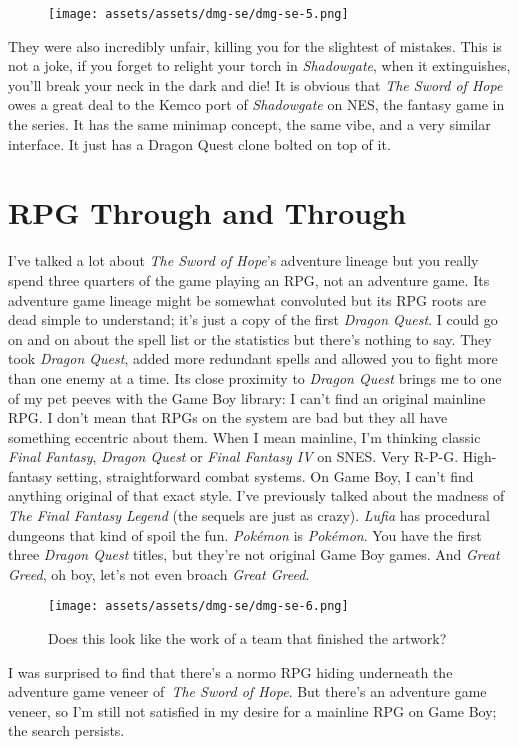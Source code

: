 \documentclass{book}
\begin{document}
\begin{figure}[hbt]
\vskip 10pt
\centering \texttt{[image: assets/assets/dmg-se/dmg-se-5.png]}
\vskip 6pt
\end{figure}
They were also incredibly unfair, killing you for the slightest of mistakes. This is not a joke, if you forget to relight your torch in \emph{Shadowgate}, when it extinguishes, you’ll break your neck in the dark and die! It is obvious that \emph{The Sword of Hope} owes a great deal to the Kemco port of \emph{Shadowgate} on NES, the fantasy game in the series. It has the same minimap concept, the same vibe, and a very similar interface. It just has a Dragon Quest clone bolted on top of it.

\FloatBarrier\needspace{10mm}\section*{RPG Through and Through}\nopagebreak[4]

I’ve talked a lot about \emph{The Sword of Hope}’s adventure lineage but you really spend three quarters of the game playing an RPG, not an adventure game. Its adventure game lineage might be somewhat convoluted but its RPG roots are dead simple to understand; it’s just a copy of the first \emph{Dragon Quest}. I could go on and on about the spell list or the statistics but there’s nothing to say. They took \emph{Dragon Quest}, added more redundant spells and allowed you to fight more than one enemy at a time. Its close proximity to \emph{Dragon Quest} brings me to one of my pet peeves with the Game Boy library: I can’t find an original mainline RPG. I don’t mean that RPGs on the system are bad but they all have something eccentric about them. When I mean mainline, I’m thinking classic \emph{Final Fantasy}, \emph{Dragon Quest} or \emph{Final Fantasy IV} on SNES. Very R-P-G. High-fantasy setting, straightforward combat systems. On Game Boy, I can’t find anything original of that exact style. I’ve previously talked about the madness of \emph{The Final Fantasy Legend} (the sequels are just as crazy). \emph{Lufia} has procedural dungeons that kind of spoil the fun. \emph{Pokémon} is \emph{Pokémon}. You have the first three \emph{Dragon Quest} titles, but they’re not original Game Boy games. And \emph{Great Greed}, oh boy, let’s not even broach \emph{Great Greed}.

\begin{figure}[hbt]
\vskip 10pt
\centering \texttt{[image: assets/assets/dmg-se/dmg-se-6.png]}\par\pagetwodescription Does this look like the work of a team that finished the artwork?
\vskip 6pt
\end{figure}
I was surprised to find that there’s a normo RPG hiding underneath the adventure game veneer of \emph{The Sword of Hope}. But there’s an adventure game veneer, so I’m still not satisfied in my desire for a mainline RPG on Game Boy; the search persists.
\end{document}
